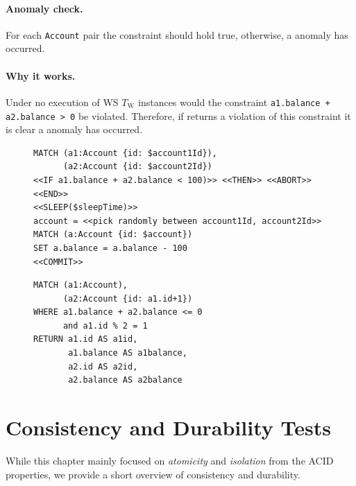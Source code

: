 \paragraph{Anomaly check.}
For each \texttt{Account} pair the constraint should hold true, otherwise, a 
 anomaly has occurred.

\paragraph{Why it works.}
Under no  execution of WS $T_\mathrm{W}$ instances would the 
constraint \texttt{a1.balance + a2.balance > 0} be violated. Therefore, if 
 returns a violation of this constraint it is clear a 
 anomaly has occurred.

\begin{figure}[htb]
\centering
\begin{minipage}{0.55\linewidth}
\begin{lstlisting}[language=cypher,label=fig:ws1,caption=\tx{WS $T_\mathrm{W}$}.]
MATCH (a1:Account {id: $account1Id}), 
      (a2:Account {id: $account2Id})
<<IF a1.balance + a2.balance < 100)>> <<THEN>> <<ABORT>> <<END>>
<<SLEEP($sleepTime)>>
account = <<pick randomly between account1Id, account2Id>>
MATCH (a:Account {id: $account})
SET a.balance = a.balance - 100
<<COMMIT>>
\end{lstlisting}
\end{minipage}
\quad
\begin{minipage}{0.33\linewidth}
\begin{lstlisting}[language=cypher,label=fig:ws2,caption=\tx{WS $T_\mathrm{R}$}.]
MATCH (a1:Account), 
      (a2:Account {id: a1.id+1})
WHERE a1.balance + a2.balance <= 0 
      and a1.id % 2 = 1
RETURN a1.id AS a1id, 
       a1.balance AS a1balance, 
       a2.id AS a2id, 
       a2.balance AS a2balance
\end{lstlisting}
\end{minipage}
\end{figure}

\newpage

\section{Consistency and Durability Tests}
\label{sec:cd}

While this chapter mainly focused on \emph{atomicity} and \emph{isolation} from 
the ACID properties, we provide a short overview of consistency and durability.

